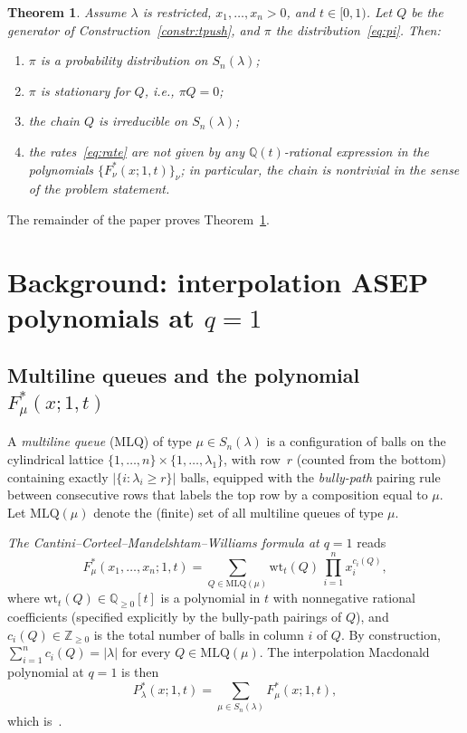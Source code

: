 \documentclass[12pt]{article}
\newtheorem{theorem}{Theorem}
\theoremstyle{definition}
\begin{document}
\begin{theorem}\label{thm:main}
Assume $\lambda$ is restricted, $x_1,\dots,x_n>0$, and $t\in[0,1)$. Let
$Q$ be the generator of Construction~\ref{constr:tpush}, and $\pi$ the
distribution~\eqref{eq:pi}. Then:
\begin{enumerate}[label=\textnormal{(\roman*)}]
\item $\pi$ is a probability distribution on $S_n(\lambda)$;
\item $\pi$ is stationary for $Q$, i.e., $\pi Q=0$;
\item the chain $Q$ is irreducible on $S_n(\lambda)$;
\item the rates~\eqref{eq:rate} are not given by any $\mathbb{Q}(t)$-rational
expression in the polynomials $\{F^*_\nu(x;1,t)\}_{\nu}$; in particular,
the chain is nontrivial in the sense of the problem statement.
\end{enumerate}
\end{theorem}

The remainder of the paper proves Theorem~\ref{thm:main}.

\section{Background: interpolation ASEP polynomials at $q=1$}\label{sec:cmw}

\subsection{Multiline queues and the polynomial $F^*_\mu(x;1,t)$}

A \emph{multiline queue} (MLQ) of type $\mu\in S_n(\lambda)$ is a
configuration of balls on the cylindrical lattice
$\{1,\dots,n\}\times\{1,\dots,\lambda_1\}$, with row~$r$ (counted from
the bottom) containing exactly $|\{i:\lambda_i\ge r\}|$ balls, equipped
with the \emph{bully-path} pairing rule between consecutive rows that
labels the top row by a composition equal to $\mu$. Let
$\mathrm{MLQ}(\mu)$ denote the (finite) set of all multiline queues of
type $\mu$.

\emph{The Cantini--Corteel--Mandelshtam--Williams formula at $q=1$}
\cite[Theorem~3.1]{CMW} reads
\begin{equation}\label{eq:mlq}
F^*_\mu(x_1,\dots,x_n;1,t)=
\sum_{Q\in\mathrm{MLQ}(\mu)}
\mathrm{wt}_t(Q)\,
\prod_{i=1}^n x_i^{c_i(Q)},
\end{equation}
where $\mathrm{wt}_t(Q)\in\mathbb{Q}_{\ge 0}[t]$ is a polynomial in $t$
with nonnegative rational coefficients (specified explicitly by the
bully-path pairings of $Q$), and $c_i(Q)\in\mathbb{Z}_{\ge 0}$ is the
total number of balls in column $i$ of $Q$. By construction,
$\sum_{i=1}^n c_i(Q)=|\lambda|$ for every $Q\in\mathrm{MLQ}(\mu)$.
The interpolation Macdonald polynomial at $q=1$ is then
\begin{equation}\label{eq:Pdef}
P^*_\lambda(x;1,t)=\sum_{\mu\in S_n(\lambda)}F^*_\mu(x;1,t),
\end{equation}
which is~\cite[Eq.\ (1.6) and Theorem~3.5]{CMW}.
\end{document}
